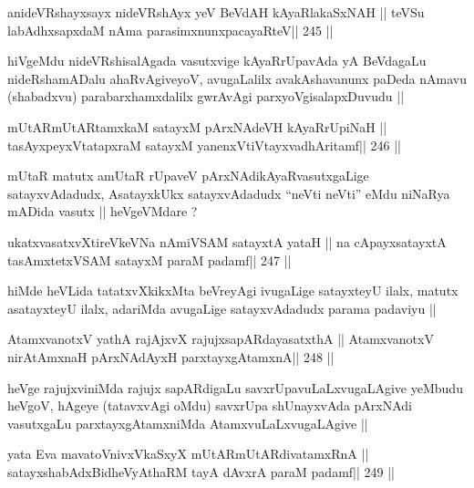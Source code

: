 \begin{shl}
anideVRshayxsayx nideVRshAyx yeV BeVdAH kAyaRlakaSxNAH ||
teVSu labAdhxsapxdaM nAma parasimxnunxpacayaRteV\hfill || 245 ||
\end{shl}

\begin{artha}
hiVgeMdu nideVRshisalAgada vasutxvige kAyaRrUpavAda yA BeVdagaLu
nideRshamADalu ahaRvAgiveyoV, avugaLalilx avakAshavanunx paDeda nAmavu
(shabadxvu) parabarxhamxdalilx gwrAvAgi parxyoVgisalapxDuvudu ||
\end{artha}

\begin{shl}
mUtARmUtARtamxkaM satayxM pArxNAdeVH kAyaRrUpiNaH ||
tasAyxpeyxVtatapxraM satayxM yanenxVtiVtayxvadhAritamf\hfill || 246 ||
\end{shl}

\begin{artha}
mUtaR matutx amUtaR rUpaveV pArxNAdikAyaRvasutxgaLige satayxvAdadudx,
AsatayxkUkx satayxvAdadudx ``neVti neVti'' eMdu niNaRya mADida vasutx
|| heVgeVMdare ?
\end{artha}

\begin{shl}
ukatxvasatxvXtireVkeVNa nAmiVSAM satayxtA yataH ||
na cApayxsatayxtA tasAmxtetxVSAM satayxM paraM padamf\hfill || 247 ||
\end{shl}

\begin{artha}
hiMde heVLida tatatxvXkikxMta beVreyAgi ivugaLige satayxteyU ilalx,
matutx asatayxteyU ilalx, adariMda avugaLige satayxvAdadudx parama
padaviyu ||
\end{artha}

\begin{shl}
AtamxvanotxV yathA rajAjxvX rajujxsapARdayasatxthA ||
AtamxvanotxV nirAtAmxnaH pArxNAdAyxH parxtayxgAtamxnA\hfill || 248 ||
\end{shl}

\begin{artha}
heVge rajujxviniMda rajujx sapARdigaLu savxrUpavuLaLxvugaLAgive
yeMbudu heVgoV, hAgeye (tatavxvAgi oMdu) savxrUpa shUnayxvAda pArxNAdi
vasutxgaLu parxtayxgAtamxniMda AtamxvuLaLxvugaLAgive ||
\end{artha}

\begin{shl}
yata Eva mavatoV\s nivxVkaSxyX mUtARmUtARdivatamxRnA ||
satayxshabAdxBidheVyAthaRM tayA dAvxrA paraM padamf\hfill || 249 ||
\end{shl}

